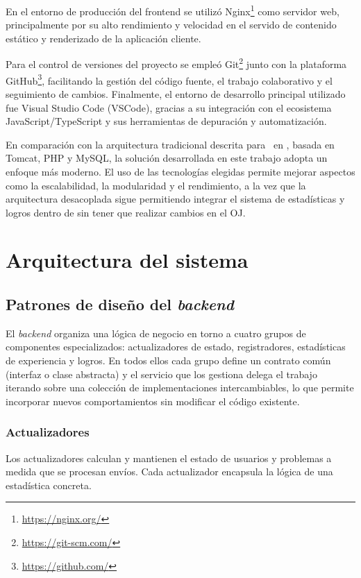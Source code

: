 En el entorno de producción del frontend se utilizó Nginx\footnote{\url{https://nginx.org/}} como servidor web, principalmente por su alto rendimiento y velocidad en el servido de contenido estático y renderizado de la aplicación cliente.

Para el control de versiones del proyecto se empleó Git\footnote{\url{https://git-scm.com/}} junto con la plataforma GitHub\footnote{\url{https://github.com/}}, facilitando la gestión del código fuente, el trabajo colaborativo y el seguimiento de cambios. Finalmente, el entorno de desarrollo principal utilizado fue Visual Studio Code (VSCode), gracias a su integración con el ecosistema JavaScript/TypeScript y sus herramientas de depuración y automatización.

En comparación con la arquitectura tradicional descrita para \aer\ en \cite{Pedro_Pablo_Gomez_Martin_Marco_Antonio_Gomez_Martin_2017}, basada en Tomcat, PHP y MySQL, la solución desarrollada en este trabajo adopta un enfoque más moderno. El uso de las tecnologías elegidas permite mejorar aspectos como la escalabilidad, la modularidad y el rendimiento, a la vez que la arquitectura desacoplada sigue permitiendo integrar el sistema de estadísticas y logros dentro de \aer sin tener que realizar cambios en el OJ.

\section{Arquitectura del sistema}

\subsection{Patrones de diseño del \textit{backend}}
\label{sec:patronesDiseno}

El \textit{backend} organiza una lógica de negocio en torno a cuatro grupos de componentes especializados: actualizadores de estado, registradores, estadísticas de experiencia y logros. En todos ellos cada grupo define un contrato común (interfaz o clase abstracta) y el servicio que los gestiona delega el trabajo iterando sobre una colección de implementaciones intercambiables, lo que permite incorporar nuevos comportamientos sin modificar el código existente.

\subsubsection{Actualizadores}

Los actualizadores calculan y mantienen el estado de usuarios y problemas a medida que se procesan envíos. Cada actualizador encapsula la lógica de una estadística concreta.

